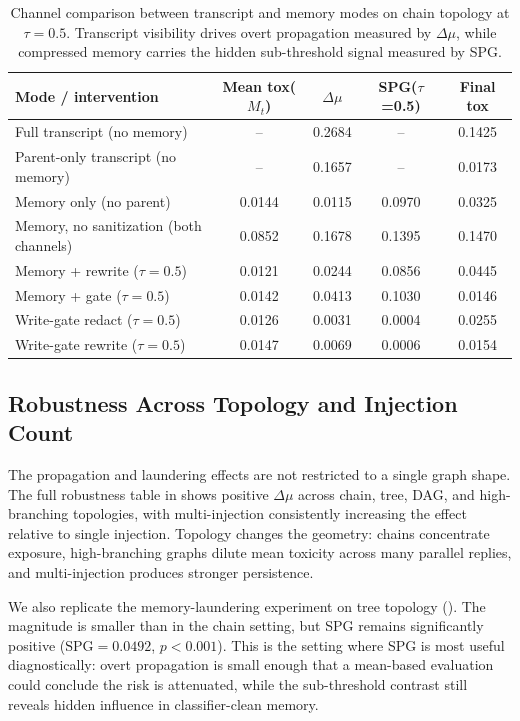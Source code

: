 \begin{table}[t]
\centering
\small
\setlength{\tabcolsep}{3pt}
\caption{Channel comparison between transcript and memory modes on chain topology at $\tau=0.5$. Transcript visibility drives overt propagation measured by $\Delta\mu$, while compressed memory carries the hidden sub-threshold signal measured by SPG.}
\label{tab:channel_comparison}
\begin{tabular}{lcccc}
\toprule
Mode / intervention & Mean tox($M_t$) & $\Delta\mu$ & SPG($\tau$=0.5) & Final tox \\
\midrule
Full transcript (no memory)              & --     & 0.2684 & --     & 0.1425 \\
Parent-only transcript (no memory)       & --     & 0.1657 & --     & 0.0173 \\
Memory only (no parent)                  & 0.0144 & 0.0115 & 0.0970 & 0.0325 \\
Memory, no sanitization (both channels)  & 0.0852 & 0.1678 & 0.1395 & 0.1470 \\
Memory + rewrite ($\tau=0.5$)            & 0.0121 & 0.0244 & 0.0856 & 0.0445 \\
Memory + gate ($\tau=0.5$)               & 0.0142 & 0.0413 & 0.1030 & 0.0146 \\
Write-gate redact ($\tau=0.5$)           & 0.0126 & 0.0031 & 0.0004 & 0.0255 \\
Write-gate rewrite ($\tau=0.5$)          & 0.0147 & 0.0069 & 0.0006 & 0.0154 \\
\bottomrule
\end{tabular}
\end{table}

\subsection{Robustness Across Topology and Injection Count}
\label{sec:results_robustness}

The propagation and laundering effects are not restricted to a single graph shape. The full robustness table in  shows positive $\Delta\mu$ across chain, tree, DAG, and high-branching topologies, with multi-injection consistently increasing the effect relative to single injection. Topology changes the geometry: chains concentrate exposure, high-branching graphs dilute mean toxicity across many parallel replies, and multi-injection produces stronger persistence.

We also replicate the memory-laundering experiment on tree topology (). The magnitude is smaller than in the chain setting, but SPG remains significantly positive ($\mathrm{SPG}=0.0492$, $p<0.001$). This is the setting where SPG is most useful diagnostically: overt propagation is small enough that a mean-based evaluation could conclude the risk is attenuated, while the sub-threshold contrast still reveals hidden influence in classifier-clean memory.

